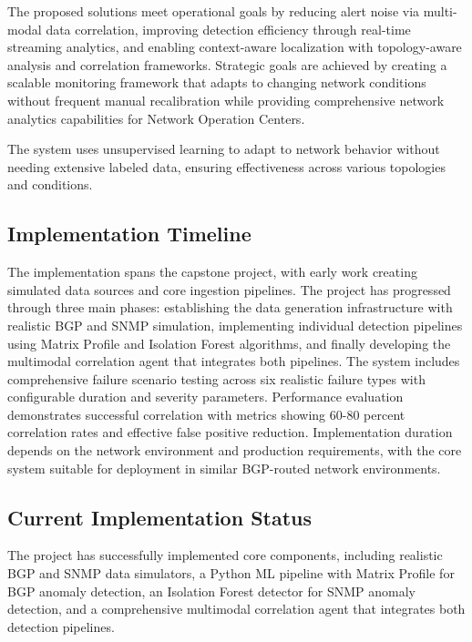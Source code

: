 \documentclass[11pt]{article}
\begin{document}
The proposed solutions meet operational goals by reducing alert noise via multi-modal data correlation, improving detection efficiency through real-time streaming analytics, and enabling context-aware localization with topology-aware analysis and correlation frameworks. Strategic goals are achieved by creating a scalable monitoring framework that adapts to changing network conditions without frequent manual recalibration while providing comprehensive network analytics capabilities for Network Operation Centers.

The system uses unsupervised learning to adapt to network behavior without needing extensive labeled data, ensuring effectiveness across various topologies and conditions.

\subsection{Implementation Timeline}

The implementation spans the capstone project, with early work creating simulated data sources and core ingestion pipelines. The project has progressed through three main phases: establishing the data generation infrastructure with realistic BGP and SNMP simulation, implementing individual detection pipelines using Matrix Profile and Isolation Forest algorithms, and finally developing the multimodal correlation agent that integrates both pipelines. The system includes comprehensive failure scenario testing across six realistic failure types with configurable duration and severity parameters. Performance evaluation demonstrates successful correlation with metrics showing 60-80 percent correlation rates and effective false positive reduction. Implementation duration depends on the network environment and production requirements, with the core system suitable for deployment in similar BGP-routed network environments.

\subsection{Current Implementation Status}

The project has successfully implemented core components, including realistic BGP and SNMP data simulators, a Python ML pipeline with Matrix Profile for BGP anomaly detection, an Isolation Forest detector for SNMP anomaly detection, and a comprehensive multimodal correlation agent that integrates both detection pipelines.
\end{document}
